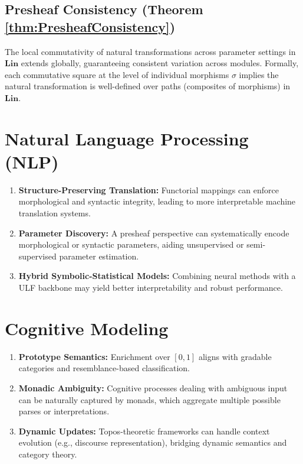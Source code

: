 \documentclass[12pt]{article}
\theoremstyle{plain}
\theoremstyle{definition}
\begin{document}
\subsection{Presheaf Consistency (Theorem \ref{thm:PresheafConsistency})}
The local commutativity of natural transformations across parameter settings in \(\mathbf{Lin}\) extends globally, guaranteeing consistent variation across modules. Formally, each commutative square at the level of individual morphisms \(\sigma\) implies the natural transformation is well-defined over paths (composites of morphisms) in \(\mathbf{Lin}\).

\section{Natural Language Processing (NLP)}\label{sec:nlp}
\begin{enumerate}
    \item \textbf{Structure-Preserving Translation:} 
    Functorial mappings can enforce morphological and syntactic integrity, 
    leading to more interpretable machine translation systems.

    \item \textbf{Parameter Discovery:} 
    A presheaf perspective can systematically encode morphological or syntactic 
    parameters, aiding unsupervised or semi-supervised parameter estimation.

    \item \textbf{Hybrid Symbolic-Statistical Models:} 
    Combining neural methods with a ULF backbone may yield better interpretability 
    and robust performance.
\end{enumerate}

\section{Cognitive Modeling}\label{sec:cog}
\begin{enumerate}
    \item \textbf{Prototype Semantics:} 
    Enrichment over $[0,1]$ aligns with gradable categories 
    and resemblance-based classification.

    \item \textbf{Monadic Ambiguity:} 
    Cognitive processes dealing with ambiguous input can be naturally captured by 
    monads, which aggregate multiple possible parses or interpretations.

    \item \textbf{Dynamic Updates:} 
    Topos-theoretic frameworks can handle context evolution (e.g., discourse 
    representation), bridging dynamic semantics and category theory.
\end{enumerate}
\end{document}
